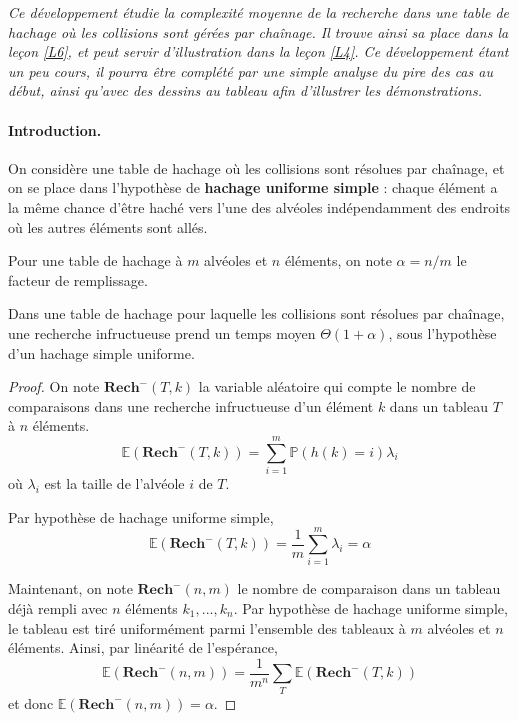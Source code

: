 
\textit{Ce développement étudie la complexité moyenne de la recherche dans une table de hachage où les collisions sont gérées par chaînage. Il trouve ainsi sa place dans la leçon \ref{L6}, et peut servir d'illustration dans la leçon \ref{L4}. Ce développement étant un peu cours, il pourra être complété par une simple analyse du pire des cas au début, ainsi qu'avec des dessins au tableau afin d'illustrer les démonstrations.}

\paragraph{Introduction.} On considère une table de hachage où les collisions sont résolues par chaînage, et on se place dans l'hypothèse de \textbf{hachage uniforme simple} : chaque élément a la même chance d'être haché vers l'une des alvéoles indépendamment des endroits où les autres éléments sont allés.

Pour une table de hachage à $m$ alvéoles et $n$ éléments, on note $\alpha = n/m$ le facteur de remplissage.

\begin{theorem}
Dans une table de hachage pour laquelle les collisions sont résolues par chaînage, une recherche infructueuse prend un temps moyen $\Theta(1+\alpha)$, sous l'hypothèse d'un hachage simple uniforme.
\end{theorem}

\begin{proof}
On note $\mathbf{Rech}^-(T,k)$ la variable aléatoire qui compte le nombre de comparaisons dans une recherche infructueuse d'un élément $k$ dans un tableau $T$ à $n$ éléments.
$$
\mathbb{E}(\mathbf{Rech}^-(T,k)) = \sum_{i=1}^m \mathbb{P}(h(k)=i) \lambda_i
$$
où $\lambda_i$ est la taille de l'alvéole $i$ de $T$.

Par hypothèse de hachage uniforme simple, 
$$
\mathbb{E}(\mathbf{Rech}^-(T,k)) = \frac{1}{m} \sum_{i=1}^m \lambda_i = \alpha
$$

Maintenant, on note $\mathbf{Rech}^-(n,m)$ le nombre de comparaison dans un tableau déjà rempli avec $n$ éléments $k_1,...,k_n$. Par hypothèse de hachage uniforme simple, le tableau est tiré uniformément parmi l'ensemble des tableaux à $m$ alvéoles et $n$ éléments. Ainsi, par linéarité de l'espérance,
$$
\mathbb{E}(\mathbf{Rech}^-(n,m)) =\frac{1}{m^n}\sum_{T} \mathbb{E}(\mathbf{Rech}^-(T,k))
$$ 
et donc $\mathbb{E}(\mathbf{Rech}^-(n,m))=\alpha$.
\end{proof}

